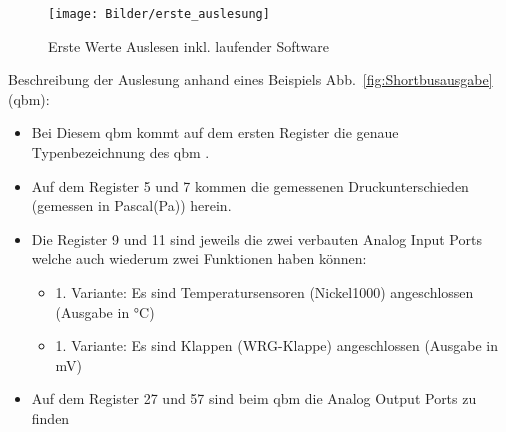 \begin{figure}[H]
	\centering
	\texttt{[image: Bilder/erste\_auslesung]}
	\caption{Erste Werte Auslesen inkl. laufender Software} 
	\label{fig:ersteauslesung}
\end{figure}

Beschreibung der Auslesung anhand eines Beispiels Abb.~\ref{fig:Shortbusausgabe} (\gls{qbm}):
\begin{itemize}
	\item Bei Diesem \gls{qbm}  kommt auf dem ersten Register die genaue Typenbezeichnung des \gls{qbm} .  
	\item Auf dem Register 5 und 7 kommen die gemessenen Druckunterschieden (gemessen in Pascal(Pa)) herein. 
	\item Die Register 9 und 11 sind jeweils die zwei verbauten Analog Input Ports welche auch wiederum zwei Funktionen haben können:
	\begin{itemize}
		\item 1. Variante: Es sind Temperatursensoren (\zB Nickel1000) angeschlossen (Ausgabe in °C)
		\item 1. Variante: Es sind Klappen (\zB WRG-Klappe) angeschlossen (Ausgabe in mV)
	\end{itemize}
	\item Auf dem Register 27 und 57 sind beim \gls{qbm} die Analog Output Ports zu finden
	
	\cite[vgl.][]{siemens:2021}
\end{itemize} 
 